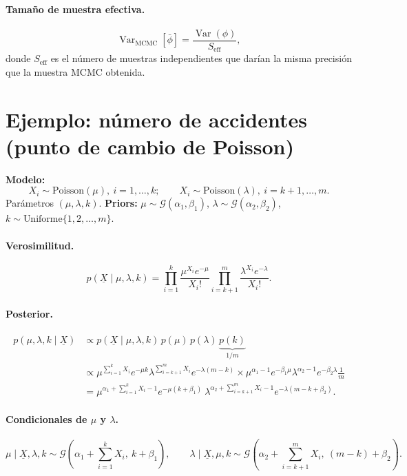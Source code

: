 \documentclass[11pt]{article}
\newcommand{\Ga}{\mathcal{G}}
\newcommand{\Var}{\operatorname{Var}}
\theoremstyle{definition}
\begin{document}
\paragraph{Tamaño de muestra efectiva.}
\[
\Var_{\text{MCMC}}[\bar\phi]=\frac{\Var(\phi)}{S_{\text{eff}}},
\]
donde $S_{\text{eff}}$ es el número de muestras independientes que darían la misma precisión que la muestra MCMC obtenida.

\section{Ejemplo: número de accidentes (punto de cambio de Poisson)}
\textbf{Modelo:}
\[
X_i\sim\text{Poisson}(\mu),\ i=1,\dots,k;\qquad X_i\sim\text{Poisson}(\lambda),\ i=k+1,\dots,m.
\]
Parámetros $(\mu,\lambda,k)$. \textbf{Priors:} $\mu\sim\Ga(\alpha_1,\beta_1)$, $\lambda\sim\Ga(\alpha_2,\beta_2)$, $k\sim\text{Uniforme}\{1,2,\dots,m\}$.

\paragraph{Verosimilitud.}
\[
p(\underline X\mid\mu,\lambda,k)=\prod_{i=1}^k\frac{\mu^{X_i}e^{-\mu}}{X_i!}\prod_{i=k+1}^m\frac{\lambda^{X_i}e^{-\lambda}}{X_i!}.
\]

\paragraph{Posterior.}
\begin{align*}
p(\mu,\lambda,k\mid\underline X)&\propto p(\underline X\mid\mu,\lambda,k)\,p(\mu)\,p(\lambda)\,\underbrace{p(k)}_{1/m}\\
&\propto\mu^{\sum_{i=1}^k X_i}e^{-\mu k}\lambda^{\sum_{i=k+1}^m X_i}e^{-\lambda(m-k)}\times\mu^{\alpha_1-1}e^{-\beta_1\mu}\lambda^{\alpha_2-1}e^{-\beta_2\lambda}\tfrac{1}{m}\\
&=\mu^{\alpha_1+\sum_{i=1}^k X_i-1}e^{-\mu(k+\beta_1)}\ \lambda^{\alpha_2+\sum_{i=k+1}^m X_i-1}e^{-\lambda(m-k+\beta_2)}.
\end{align*}

\paragraph{Condicionales de $\mu$ y $\lambda$.}
\[
\mu\mid\underline X,\lambda,k\sim\Ga\!\left(\alpha_1+\sum_{i=1}^k X_i,\ k+\beta_1\right),\qquad
\lambda\mid\underline X,\mu,k\sim\Ga\!\left(\alpha_2+\sum_{i=k+1}^m X_i,\ (m-k)+\beta_2\right).
\]
\end{document}
